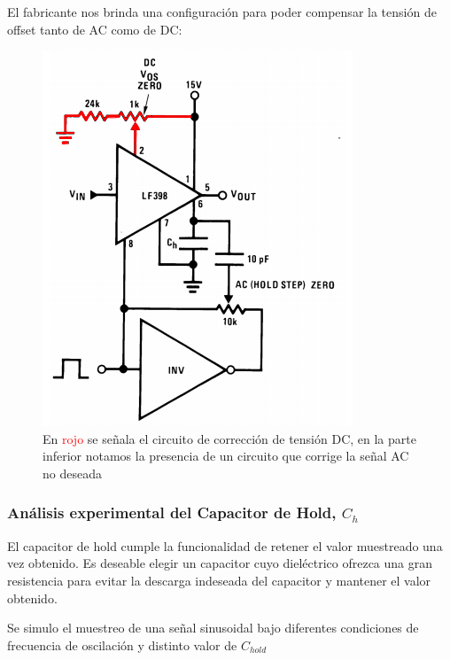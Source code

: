 El fabricante nos brinda una configuración para poder compensar la tensión de offset tanto de AC como de DC:
\begin{figure}[H]
	\centering
	\includegraphics[scale=0.6]{ImagenesEjercicio4/DCcolorized}
	\caption{En \textcolor{red}{rojo} se señala el circuito de corrección de tensión DC, en la parte inferior notamos la presencia de un circuito que corrige la señal AC no deseada}
	\label{fig:dccolorized}
\end{figure}

\subsubsection{Análisis experimental del Capacitor de Hold, $C_{h}$}
El capacitor de hold cumple la funcionalidad de retener el valor muestreado una vez obtenido. Es deseable elegir un capacitor cuyo dieléctrico ofrezca una gran resistencia para evitar la descarga indeseada del capacitor y mantener el valor obtenido.

Se simulo el muestreo de una señal sinusoidal bajo diferentes condiciones de frecuencia de oscilación y distinto valor de $C_{hold}$

